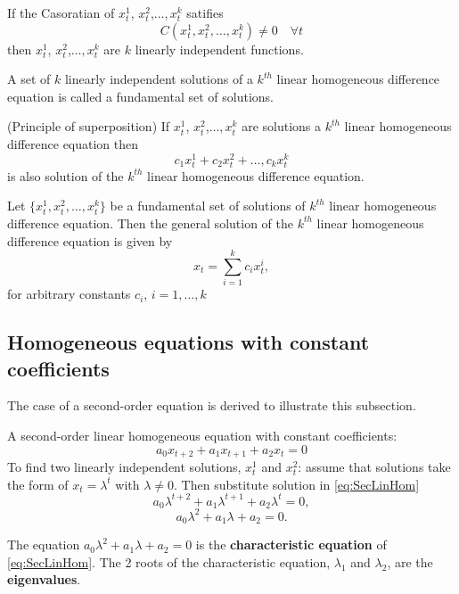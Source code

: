 \begin{proposition}
If the Casoratian of $x_t^1$, $x_t^2$,$\dots, x_t^k$ satifies
$$C(x_t^1, x_t^2,\dots, x_t^k)\not =0 \quad \forall t$$
then $x_t^1$, $x_t^2$,$\dots, x_t^k$  are $k$ linearly independent functions.
\end{proposition}

\begin{definition}
A set of $k$ linearly independent solutions of a $k^{th}$ linear homogeneous difference equation is called a fundamental set of solutions.
\end{definition}

\begin{proposition}(Principle of superposition)
If $x_t^1$, $x_t^2$,$\dots, x_t^k$ are solutions a $k^{th}$ linear homogeneous difference equation then $$c_1x_t^1+c_2x_t^2+\dots, c_kx_t^k$$
is also solution of the $k^{th}$ linear homogeneous difference equation.
\end{proposition}

\begin{definition}
Let $\{x_t^1, x_t^2,\dots, x_t^k\}$ be a fundamental set of solutions of $k^{th}$ linear homogeneous difference equation. Then the general solution of the  $k^{th}$ linear homogeneous difference equation is given by $$x_t=\sum_{i=1}^kc_ix^i_t,$$ for arbitrary constants $c_i$, $i=1,\dots, k$
\end{definition}

\subsection[Homogeneous autonomous higher-order linear equations]{Homogeneous equations with constant coefficients}
The case of a second-order equation is derived to illustrate this subsection.

A second-order linear homogeneous equation with constant coefficients:
\begin{equation}\label{eq:SecLinHom}
a_0x_{t+2}+a_1x_{t+1}+ a_2 x_{t}=0
\end{equation}
To find two linearly independent solutions, $x_t^1$ and $x_t^2$: assume that solutions take the form of 
$x_t=\lambda ^t$ with $\lambda \not= 0$. Then substitute solution in \eqref{eq:SecLinHom}
$$a_0\lambda ^{t+2}+a_1\lambda ^{t+1}+ a_2 \lambda ^{t}=0,$$
$$a_0\lambda ^{2}+a_1\lambda + a_2 =0.$$

The equation $a_0\lambda ^{2}+a_1\lambda + a_2 =0$ is the \textbf{characteristic equation} of \eqref{eq:SecLinHom}. The 2 roots of the characteristic equation, $\lambda_1$ and $\lambda_2$, are the \textbf{eigenvalues}.

